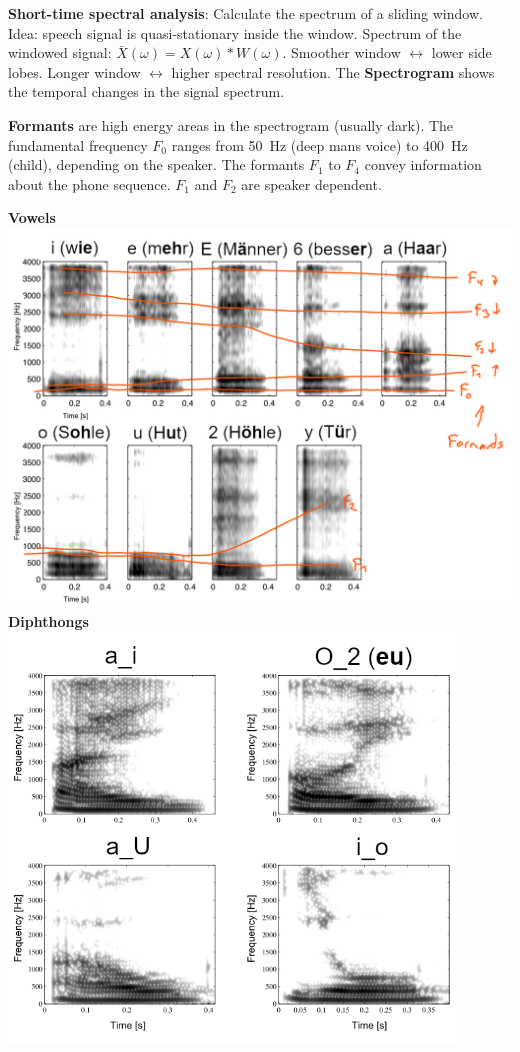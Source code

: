 \textbf{Short-time spectral analysis}: Calculate the spectrum of a sliding window.
Idea: speech signal is quasi-stationary inside the window.
Spectrum of the windowed signal: \(\bar{X}(\omega)=X(\omega)*W(\omega)\).
Smoother window \(\leftrightarrow\) lower side lobes. Longer window \(\leftrightarrow\) higher spectral resolution.
The \textbf{Spectrogram} shows the temporal changes in the signal spectrum.

\textbf{Formants} are high energy areas in the spectrogram (usually dark).
The fundamental frequency \(F_0\) ranges from 50~Hz (deep mans voice) to 400~Hz (child), depending on the speaker.
The formants \(F_1\) to \(F_4\) convey information about the phone sequence.
\(F_1\) and \(F_2\) are speaker dependent.

\begin{minipage}[t]{0.35\textwidth}
\centering
\textbf{Vowels}
\includegraphics[width=\textwidth]{img/vowels}
\textbf{Diphthongs}
\includegraphics[width=0.9\textwidth]{img/diphthongs}
\end{minipage}
